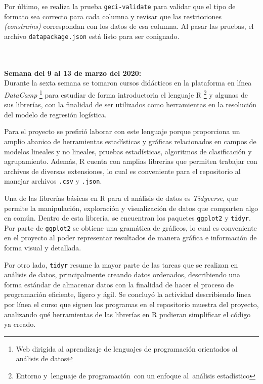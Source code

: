 \documentclass{article}
\begin{document}
    Por último, se realiza la prueba \texttt{geci-validate} para validar  que el tipo de formato sea correcto para cada columna y revisar que las restricciones \textit{(constrains)} correspondan con los datos de esa columna. Al pasar las pruebas, el archivo \texttt{datapackage.json} está listo para ser conignado.

    \\ \\
    
    \textbf{Semana del 9 al 13 de marzo del 2020:} \\
    Durante la sexta semana se tomaron cursos didácticos en la plataforma en línea \textit{DataCamp} \footnote{Web dirigida al aprendizaje de lenguajes de programación orientados al análisis de datos} para estudiar de forma introductoria el lenguaje R \footnote{Entorno y lenguaje de programación con un enfoque al análisis estadístico} y algunas de sus librerías, con la finalidad de ser utilizados como herramientas en la resolución del modelo de regresión logística.

    Para el proyecto se prefirió laborar con este lenguaje porque proporciona un amplio abanico de herramientas estadísticas y gráficas relacionados en campos de modelos lineales y no lineales, pruebas estadísticas, algoritmos de clasificación y agrupamiento. Además, R cuenta con amplias librerias que permiten trabajar con archivos de diversas extensiones, lo cual es conveniente para el repositorio al manejar archivos \texttt{.csv} y \texttt{.json}.

    Una de las librerías básicas en R para el análisis de datos es \textit{Tidyverse}, que permite la manipulación, exploración y visualización de datos que comparten algo en común. Dentro de esta librería, se encuentran los paquetes \texttt{ggplot2} y \texttt{tidyr}. Por parte de \texttt{ggplot2} se obtiene una gramática de gráficos, lo cual es conveniente en el proyecto al poder representar resultados de manera gráfica e información de forma visual y detallada.
    
    Por otro lado, \texttt{tidyr} resume la mayor parte de las tareas que se realizan en análisis de datos, principalmente creando datos ordenados, describiendo una forma estándar de almacenar datos con la finalidad de hacer el proceso de programación eficiente, ligero y ágil.
    Se concluyó la actividad describiendo línea por línea el curso que siguen los programas en el repositorio muestra del proyecto, analizando qué herramientas de las librerías en R pudieran simplificar el código ya creado.
\end{document}
